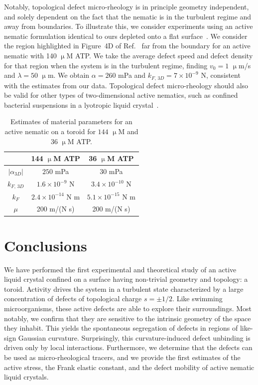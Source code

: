 Notably, topological defect micro-rheology is in principle geometry independent, and solely dependent on the fact that the nematic is in the turbulent regime and away from boundaries.
To illustrate this, we consider experiments using an active nematic formulation identical to ours depleted onto a flat surface~\cite{RN134}. We consider the region highlighted in Figure~4D of Ref.~\cite{RN134} far from the boundary for an active nematic with 140 $\upmu$M ATP.
We take the average defect speed and defect density for that region when the system is in the turbulent regime, finding $v_0 = 1$ $\upmu$m/s and $\lambda = 50$ $\upmu$m.
We obtain $\alpha = 260$ mPa and $k_{F,\, 3D} = 7 \times 10^{-9}$ N, consistent with the estimates from our data.
Topological defect micro-rheology should also be valid for other types of two-dimensional active nematics, such as confined bacterial suspensions in a lyotropic liquid crystal~\cite{RN86}.
\begin{table}
  \centering
  \caption{Estimates of material parameters for an active nematic on a toroid for $144$ $\upmu$M and 36 $\upmu$M ATP.}
  \begin{tabular}{|c|c c|}
    \hline
     & 144 $\upmu$M ATP & 36 $\upmu$M ATP \\
     \hline
     $|\alpha_{3D}|$ &  $250$ mPa & $30$ mPa \\
     $k_{F,\, 3D}$ & $1.6 \times 10^{-9}$ N & $3.4 \times 10^{-10}$ N \\
     $k_F$ & $2.4 \times 10^{-14}$ N m & $5.1 \times 10^{-15}$ N m \\
     $\mu$ & 200 m/(N s) & 200 m/(N s) \\
     \hline
  \end{tabular}\label{t:3-MaterialParams}
\end{table}



\section{Conclusions}
We have performed the first experimental and theoretical study of an active liquid crystal confined on a surface having non-trivial geometry and topology: a toroid.
Activity drives the system in a turbulent state characterized by a large concentration of defects of topological charge $s = \pm 1/2$.
Like swimming microorganisms, these active defects are able to explore their surroundings.
Most notably, we confirm that they are sensitive to the intrinsic geometry of the space they inhabit.
This yields the spontaneous segregation of defects in regions of like-sign Gaussian curvature.
Surprisingly, this curvature-induced defect unbinding is driven only by local interactions.
Furthermore, we determine that the defects can be used as micro-rheological tracers, and we provide the first estimates of the active stress, the Frank elastic constant, and the defect mobility of active nematic liquid crystals.

